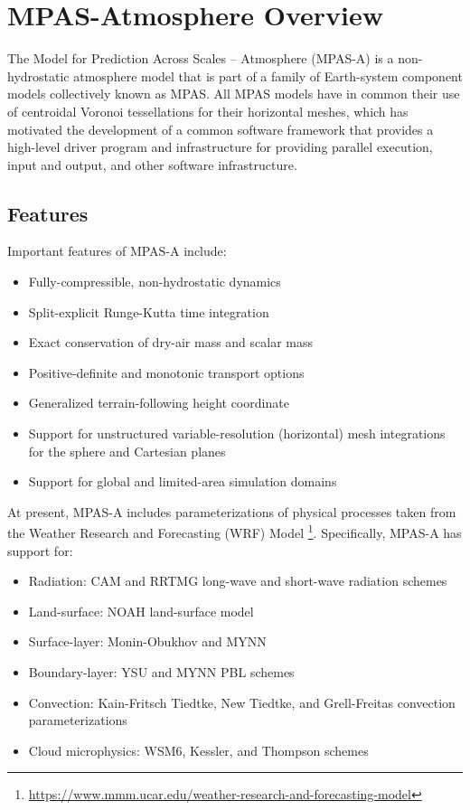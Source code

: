 
\chapter{MPAS-Atmosphere Overview}
\label{chap:atmosphere_overview}

The Model for Prediction Across Scales -- Atmosphere (MPAS-A) is a
non-hydrostatic atmosphere model that is part of a family of
Earth-system component models collectively known as MPAS.  All MPAS
models have in common their use of centroidal Voronoi tessellations for
their horizontal meshes, which has motivated the development of a common
software framework that provides a high-level driver program and
infrastructure for providing parallel execution, input and output, and
other software infrastructure.

\section{Features}

Important features of MPAS-A include:

\begin{itemize}
\item Fully-compressible, non-hydrostatic dynamics
\item Split-explicit Runge-Kutta time integration
\item Exact conservation of dry-air mass and scalar mass
\item Positive-definite and monotonic transport options
\item Generalized terrain-following height coordinate
\item Support for unstructured variable-resolution (horizontal) mesh integrations for the sphere and Cartesian planes
\item Support for global and limited-area simulation domains
\end{itemize}

At present, MPAS-A includes parameterizations of physical processes
taken from the Weather Research and Forecasting (WRF) Model
\footnote{\url{https://www.mmm.ucar.edu/weather-research-and-forecasting-model}}. Specifically, MPAS-A has
support for:

\begin{itemize}
\item Radiation: CAM and RRTMG long-wave and short-wave radiation schemes
\item Land-surface: NOAH land-surface model
\item Surface-layer: Monin-Obukhov and MYNN
\item Boundary-layer: YSU and MYNN PBL schemes
\item Convection: Kain-Fritsch Tiedtke, New Tiedtke, and Grell-Freitas convection parameterizations
\item Cloud microphysics: WSM6, Kessler, and Thompson schemes
\end{itemize}


